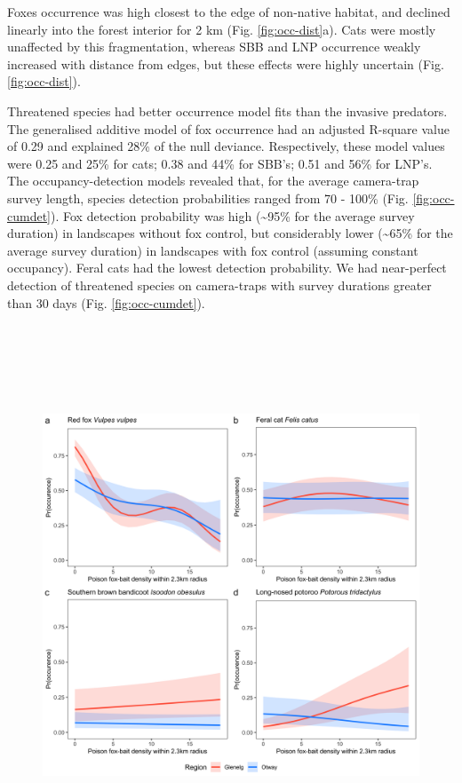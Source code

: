 \documentclass[11pt,a4paper,titlepage,twoside,openright]{style/unimelbthesis}
\begin{document}
\begin{mainmatter}
Foxes occurrence was high closest to the edge of non-native habitat, and declined linearly into the forest interior for 2 km (Fig. \ref{fig:occ-dist}a). Cats were mostly unaffected by this fragmentation, whereas SBB and LNP occurrence weakly increased with distance from edges, but these effects were highly uncertain (Fig. \ref{fig:occ-dist}).

Threatened species had better occurrence model fits than the invasive predators. The generalised additive model of fox occurrence had an adjusted R-square value of 0.29 and explained 28\% of the null deviance. Respectively, these model values were 0.25 and 25\% for cats; 0.38 and 44\% for SBB's; 0.51 and 56\% for LNP's. The occupancy-detection models revealed that, for the average camera-trap survey length, species detection probabilities ranged from 70 - 100\% (Fig. \ref{fig:occ-cumdet}). Fox detection probability was high (\textasciitilde95\% for the average survey duration) in landscapes without fox control, but considerably lower (\textasciitilde65\% for the average survey duration) in landscapes with fox control (assuming constant occupancy). Feral cats had the lowest detection probability. We had near-perfect detection of threatened species on camera-traps with survey durations greater than 30 days (Fig. \ref{fig:occ-cumdet}).

\newpage

\(~\)

\(~\)

\(~\)
\begin{figure}

{\centering \includegraphics[width=1\linewidth]{figure/foxbaits} 

}
\end{figure}
\end{mainmatter}
\end{document}
